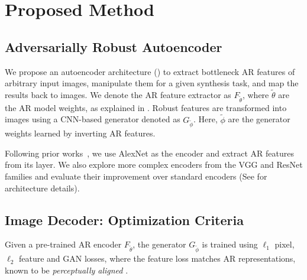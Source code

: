 \section{Proposed Method}
\label{sec:proposed}

\subsection{Adversarially Robust Autoencoder}
\label{sec:proposed_inversion}

We propose an autoencoder architecture () to extract bottleneck AR features of arbitrary input images, manipulate them for a given synthesis task, and map the results back to images. We denote the AR feature extractor as $F_{\tilde{\theta}}$, where $\tilde{\theta}$ are the AR model weights, as explained in . Robust features are transformed into images using a CNN-based generator denoted as $G_{\tilde{\phi}}$. Here, $\tilde{\phi}$ are the generator weights learned by inverting AR features.

Following prior works~\cite{ulyanov2018deep,dosovitskiy_2016_generating}, we use AlexNet as the encoder and extract AR features from its  layer. We also explore more complex encoders from the VGG and ResNet families and evaluate their improvement over standard encoders (See  for architecture details).



\subsection{Image Decoder: Optimization Criteria}
\label{sec:opt_crit}

Given a pre-trained AR encoder $F_{\tilde{\theta}}$, the generator $G_{\tilde{\phi}}$ is trained using $\ell_{1}$ pixel, $\ell_{2}$ feature and GAN losses, where the feature loss matches AR representations, known to be \textit{perceptually aligned} \cite{engstrom_2019_adversarial}.

